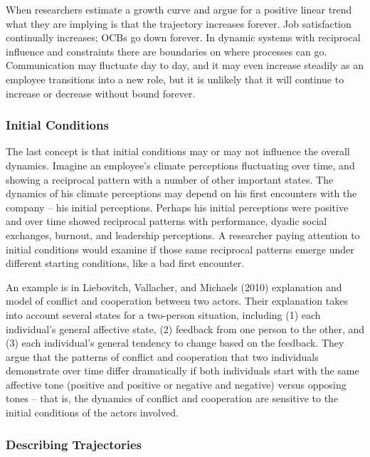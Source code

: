 \documentclass[english,,man]{apa6}
\theoremstyle{definition}
\theoremstyle{definition}
\theoremstyle{definition}
\theoremstyle{remark}
\begin{document}
When researchers estimate a growth curve and argue for a positive linear
trend what they are implying is that the trajectory increases forever.
Job satisfaction continually increases; OCBs go down forever. In dynamic
systems with reciprocal influence and constraints there are boundaries
on where processes can go. Communication may fluctuate day to day, and
it may even increase steadily as an employee transitions into a new
role, but it is unlikely that it will continue to increase or decrease
without bound forever.

\hypertarget{initial-conditions}{%
\subsubsection{Initial Conditions}\label{initial-conditions}}

The last concept is that initial conditions may or may not influence the
overall dynamics. Imagine an employee's climate perceptions fluctuating
over time, and showing a reciprocal pattern with a number of other
important states. The dynamics of his climate perceptions may depend on
his first encounters with the company -- his initial perceptions.
Perhaps his initial perceptions were positive and over time showed
reciprocal patterns with performance, dyadic social exchanges, burnout,
and leadership perceptions. A researcher paying attention to initial
conditions would examine if those same reciprocal patterns emerge under
different starting conditions, like a bad first encounter.

An example is in Liebovitch, Vallacher, and Michaels (2010) explanation
and model of conflict and cooperation between two actors. Their
explanation takes into account several states for a two-person
situation, including (1) each individual's general affective state, (2)
feedback from one person to the other, and (3) each individual's general
tendency to change based on the feedback. They argue that the patterns
of conflict and cooperation that two individuals demonstrate over time
differ dramatically if both individuals start with the same affective
tone (positive and positive or negative and negative) versus opposing
tones -- that is, the dynamics of conflict and cooperation are sensitive
to the initial conditions of the actors involved.

\hypertarget{describing-trajectories}{%
\subsubsection{Describing Trajectories}\label{describing-trajectories}}
\end{document}
